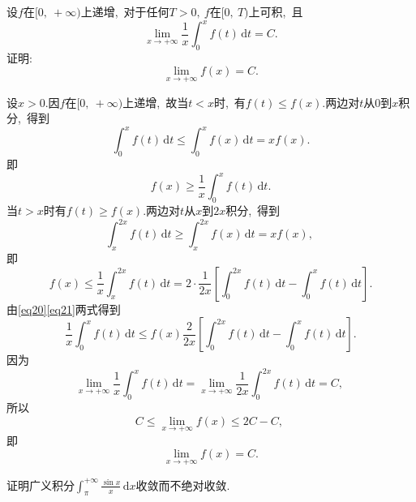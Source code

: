 	\newpage
	\begin{problem}
		设$f$在$[0,\ +\infty)$上递增,\ 对于任何$T>0,\ f$在$[0,\ T)$上可积,\ 且
		$$\lim\limits_{x\rightarrow+\infty}\frac{1}{x}\int_{0}^{x}f(t)\,\text{d}t=C.$$
		证明:
		$$\lim\limits_{x\rightarrow+\infty}f(x)=C.$$
	\end{problem}
	
	\begin{solution}
		设$x>0.$因$f$在$[0,\ +\infty)$上递增,\ 故当$t<x$时,\ 有$f(t)\le f(x).$两边对$t$从$0$到$x$积分,\ 得到
		$$\int_{0}^{x}f(t)\,\text{d}t\le\int_{0}^{x}f(x)\,\text{d}t=xf(x).$$
		即
		\begin{equation}
			f(x)\ge \frac{1}{x}\int_{0}^{x}f(t)\,\text{d}t.\label{eq20}
		\end{equation}
		当$t>x$时有$f(t)\ge f(x).$两边对$t$从$x$到$2x$积分,\ 得到
		$$\int_{x}^{2x}f(t)\,\text{d}t\ge \int_{x}^{2x}f(x)\,\text{d}t=xf(x),\ $$
		即
		\begin{equation}
			f(x)\le \frac{1}{x}\int_{x}^{2x}f(t)\,\text{d}t=2\cdot\frac{1}{2x}\left[\int_{0}^{2x}f(t)\,\text{d}t-\int_{0}^{x}f(t)\,\text{d}t\right].\label{eq21}
		\end{equation}
		由\eqref{eq20}\eqref{eq21}两式得到
		$$\frac{1}{x}\int_{0}^{x}f(t)\,\text{d}t\le f(x)\frac{2}{2x}\left[\int_{0}^{2x}f(t)\,\text{d}t-\int_{0}^{x}f(t)\,\text{d}t\right].$$
		因为
		$$\lim\limits_{x\rightarrow+\infty}\frac{1}{x}\int_{0}^{x}f(t)\,\text{d}t=\lim\limits_{x\rightarrow+\infty}\frac{1}{2x}\int_{0}^{2x}f(t)\,\text{d}t=C,\ $$
		所以
		$$C\le \lim\limits_{x\rightarrow+\infty}f(x)\le 2C-C,\ $$
		即
		$$\lim\limits_{x\rightarrow+\infty}f(x)=C.$$ 
	\end{solution}
	\newpage
	\begin{problem}
		证明广义积分$\int_{\pi}^{+\infty}\frac{\sin x}{x}\,\text{d}x$收敛而不绝对收敛.
	\end{problem}
	
